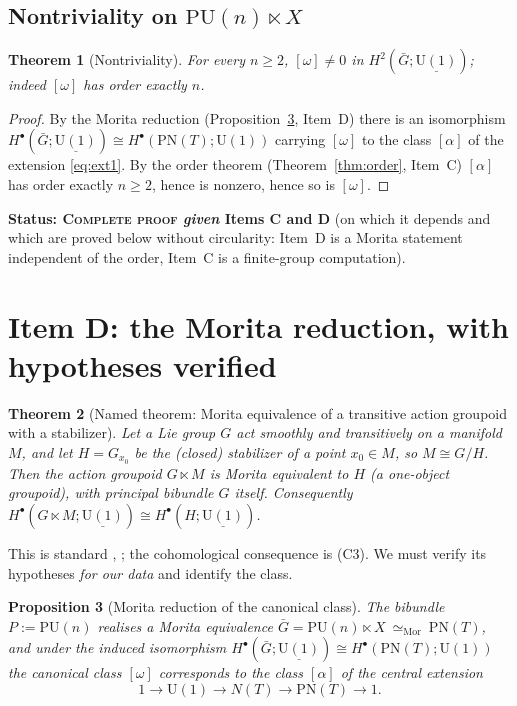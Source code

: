\documentclass[11pt]{article}
\newtheorem{theorem}{Theorem}[section]
\newtheorem{proposition}[theorem]{Proposition}
\theoremstyle{definition}
\newcommand{\U}{\mathrm{U}}
\newcommand{\PU}{\mathrm{PU}}
\newcommand{\PN}{\mathrm{PN}}
\newcommand{\Nt}{N(T)}
\newcommand{\STAT}[1]{\noindent\textbf{Status: #1}}
\newcommand{\COMPLETE}{\textsc{Complete proof}}
\begin{document}
\subsection{Nontriviality on $\PU(n)\ltimes X$}

\begin{theorem}[Nontriviality]\label{thm:nontrivial}
For every $n\ge2$, $[\omega]\neq0$ in $H^2(\bar G;\underline{\U(1)})$; indeed $[\omega]$ has
order exactly $n$.
\end{theorem}

\begin{proof}
By the Morita reduction (Proposition~\ref{prop:morita}, Item~D) there is an isomorphism
$H^{\bullet}(\bar G;\underline{\U(1)})\cong H^{\bullet}(\PN(T);\U(1))$ carrying $[\omega]$
to the class $[\alpha]$ of the extension \eqref{eq:ext1}. By the order theorem
(Theorem~\ref{thm:order}, Item~C) $[\alpha]$ has order exactly $n\ge2$, hence is nonzero,
hence so is $[\omega]$.
\end{proof}
\STAT{\COMPLETE{} \emph{given} Items C and D} (on which it depends and which are proved
below without circularity: Item~D is a Morita statement independent of the order, Item~C is
a finite-group computation).

\section{Item D: the Morita reduction, with hypotheses verified}\label{sec:D}

\begin{theorem}[Named theorem: Morita equivalence of a transitive action groupoid with a
stabilizer]\label{thm:MoritaGeneral}
Let a Lie group $G$ act smoothly and transitively on a manifold $M$, and let $H=G_{x_0}$ be
the (closed) stabilizer of a point $x_0\in M$, so $M\cong G/H$. Then the action groupoid
$G\ltimes M$ is Morita equivalent to $H$ (a one-object groupoid), with principal bibundle
$G$ itself. Consequently $H^{\bullet}(G\ltimes M;\underline{\U(1)})\cong
H^{\bullet}(H;\underline{\U(1)})$.
\end{theorem}

This is standard \cite[Ch.~5]{MoerdijkMrcun}, \cite[\S2.4]{delHoyo}; the cohomological
consequence is (C3). We must verify its hypotheses \emph{for our data} and identify the
class.

\begin{proposition}[Morita reduction of the canonical class]\label{prop:morita}
The bibundle $P:=\PU(n)$ realises a Morita equivalence
$\bar G=\PU(n)\ltimes X\ \simeq_{\mathrm{Mor}}\ \PN(T)$, and under the induced isomorphism
$H^{\bullet}(\bar G;\underline{\U(1)})\cong H^{\bullet}(\PN(T);\U(1))$ the canonical class
$[\omega]$ corresponds to the class $[\alpha]$ of the central extension
\begin{equation}\label{eq:ext1}
1\longrightarrow \U(1)\longrightarrow \Nt \longrightarrow \PN(T)\longrightarrow 1 .
\end{equation}
\end{proposition}
\end{document}

